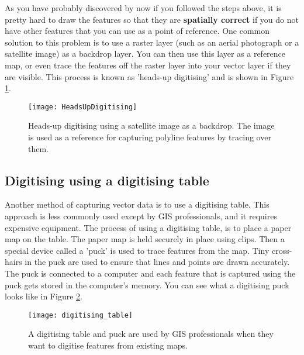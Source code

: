 As you have probably discovered by now if you followed the steps above, it is
pretty hard to draw the features so that they are \textbf{spatially correct} if you do
not have other features that you can use as a point of reference. One common
solution to this problem is to use a raster layer (such as an aerial
photograph or a satellite image) as a backdrop layer. You can then use this
layer as a reference map, or even trace the features off the raster layer
into your vector layer if they are visible. This process is known as
'heads-up digitising' and is shown in Figure \ref{fig:headsupdigi}.

\begin{figure}[ht]
   \begin{center}
   \caption{Heads-up digitising using a satellite image as a backdrop. The
image is used as a reference for capturing polyline features by tracing over
them.}
\label{fig:headsupdigi}\smallskip
   \texttt{[image: HeadsUpDigitising]}
\end{center}
\end{figure}

\subsection{Digitising using a digitising table}

Another method of capturing vector data is to use a digitising table. This
approach is less commonly used except by GIS professionals, and it requires
expensive equipment. The process of using a digitising table, is to place a
paper map on the table. The paper map is held securely in place using clips.
Then a special device called a 'puck' is used to trace features from the map.
Tiny cross-hairs in the puck are used to ensure that lines and points are
drawn accurately. The puck is connected to a computer and each feature that
is captured using the puck gets stored in the computer's memory. You can see
what a digitising puck looks like in Figure \ref{fig:digitable}.

\begin{figure}[htpb]
   \begin{center}
   \caption{A digitising table and puck are used by GIS professionals when
they want to digitise features from existing maps.}
\label{fig:digitable}\smallskip
   \texttt{[image: digitising\_table]}
\end{center}
\end{figure}

